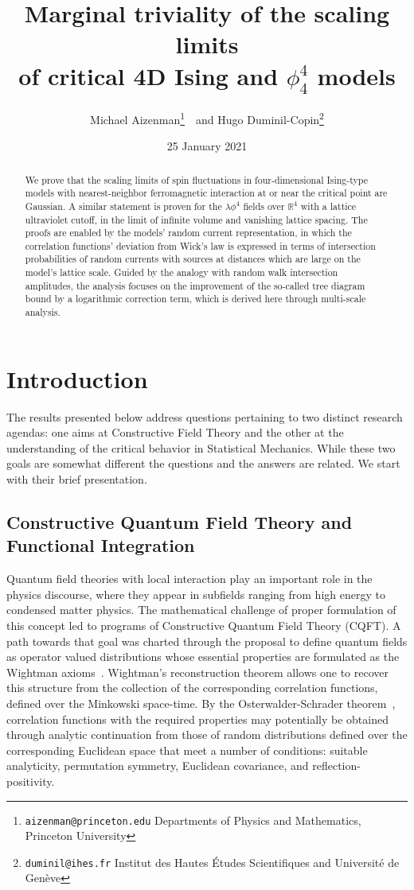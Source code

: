 \documentclass[a4paper,oneside,11pt]{article}
\title{Marginal triviality of the scaling limits \\  of critical 4D  Ising and $\phi_4^4$ models}
\author{Michael Aizenman\thanks{\texttt{aizenman@princeton.edu} Departments of Physics and Mathematics, Princeton University}\ \ and Hugo Duminil-Copin\thanks{
\texttt{duminil@ihes.fr} Institut des Hautes \'Etudes Scientifiques and Universit\'e de Gen\`eve
}}
\date{25 January 2021}
\numberwithin{equation}{section}
\numberwithin{equation}{section}
\numberwithin{equation}{section}
\begin{document}
\maketitle
\begin{abstract}
We prove that the scaling limits of spin fluctuations in four-dimensional Ising-type models with nearest-neighbor ferromagnetic interaction at or near the critical point are Gaussian. 
A similar statement is proven for the  
$\lambda \phi^4$ fields over $\mathbb{R}^4$ with a lattice ultraviolet cutoff, in the limit of infinite volume and vanishing lattice spacing.
 The proofs are enabled by the models' random current representation, in which the correlation functions' deviation from Wick's law is expressed in terms of intersection probabilities of random currents with  sources at distances which are large on the model's  lattice scale.   Guided by the analogy with random walk intersection amplitudes, the analysis focuses on the improvement of the so-called tree diagram bound by a logarithmic correction term, which is derived here through multi-scale analysis.  
 \end{abstract}

\section{Introduction}

The results presented below address questions pertaining to two distinct research agendas: one aims at Constructive Field Theory and the other at the understanding of the critical behavior in Statistical Mechanics.   
While these two goals are somewhat different 
the questions and the answers are related. We start with their brief presentation. 

\subsection{Constructive Quantum Field Theory and Functional Integration}\label{sec:1.2}

Quantum field theories with local interaction  play an important role in the physics discourse, where they appear in  subfields ranging from high energy to condensed matter physics.  
The mathematical challenge of proper formulation of this concept led to programs of Constructive Quantum Field Theory (CQFT).  A path  towards that goal was charted through the  proposal to define quantum fields as operator valued distributions whose essential properties are  formulated as the Wightman axioms~\cite{Wig56}.  Wightman's reconstruction theorem  allows one to recover this structure from the collection of the corresponding correlation functions, defined over 
the Minkowski space-time.  By the Osterwalder-Schrader theorem~\cite{OS73,OS75}, correlation functions 
with the required properties may potentially be obtained through analytic continuation from those of random distributions defined over the corresponding Euclidean space that meet a number of conditions: suitable analyticity, permutation symmetry, Euclidean covariance, and reflection-positivity.    
\end{document}
